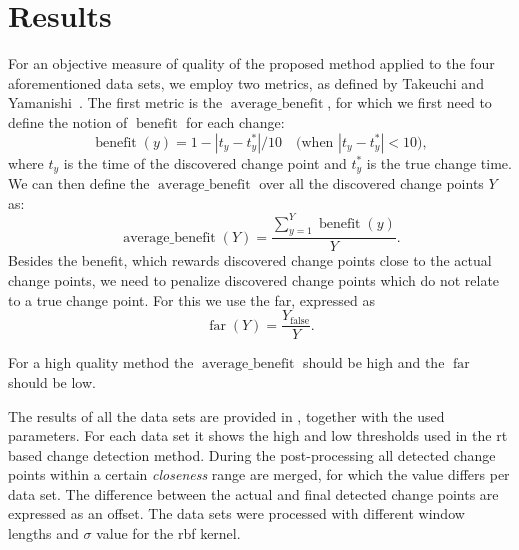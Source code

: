 \section{Results}\label{sec:artificial_data_results}
For an objective measure of quality of the proposed method applied to the four aforementioned data sets, we employ two metrics, as defined by Takeuchi and Yamanishi~\cite{takeuchi2006unifying}.
The first metric is the $\operatorname*{average \_ benefit}$, for which we first need to define the notion of $\operatorname*{benefit}$ for each change:
\begin{equation}\label{eq:benefit}
  \operatorname*{benefit}(y) = 1 - |t_y - t_y^*| / 10  \mbox{~~~(when } |t_y - t_y^*| < 10 \mbox{)},
\end{equation}
where $t_y$ is the time of the discovered change point and $t_y^*$ is the true change time.
We can then define the $\operatorname*{average \_ benefit}$ over all the discovered change points $Y$ as:
\begin{equation}\label{eq:average_benefit}
  \operatorname*{average \_ benefit}(Y) = \frac{\sum_{y=1}^Y \operatorname*{benefit}(y)}{Y}.
\end{equation}
Besides the benefit, which rewards discovered change points close to the actual change points, we need to penalize discovered change points which do not relate to a true change point.
For this we use the \acrlong{far}, expressed as
\begin{equation}\label{eq:false_alarm_rate}
  \operatorname*{far}(Y) = \frac{Y_{\operatorname*{false}}}{Y}.
\end{equation}

For a high quality method the $\operatorname*{average\_benefit}$ should be high and the $\operatorname*{far}$ should be low.


The results of all the data sets are provided in , together with the used parameters.
For each data set it shows the high and low thresholds used in the \gls{rt} based change detection method.
During the post-processing all detected change points within a certain \emph{closeness} range are merged, for which the value differs per data set.
The difference between the actual and final detected change points are expressed as an offset.
The data sets were processed with different window lengths and $\sigma$ value for the \gls{rbf} kernel.


